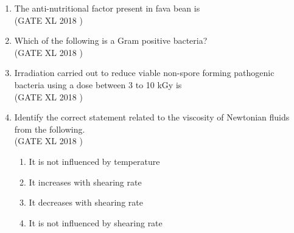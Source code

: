 \documentclass[14pt]{extarticle}
\begin{document}
\begin{flushleft}
\begin{enumerate}
\item The anti-nutritional factor present in fava bean is\\
\hfill(GATE XL 2018 )\\
\begin{enumerate}
\end{enumerate}

\item Which of the following is a Gram positive bacteria?\\
\hfill(GATE XL 2018 )\\
\begin{enumerate}
\end{enumerate}

\item Irradiation carried out to reduce viable non-spore forming pathogenic bacteria using a dose between 3 to 10 kGy is\\
\hfill(GATE XL 2018 )\\
\begin{enumerate}
\end{enumerate}

\item Identify the correct statement related to the viscosity of Newtonian fluids from the following.\\
\hfill(GATE XL 2018 )\\

\begin{enumerate}
    \item It is not influenced by temperature
    \item It increases with shearing rate
    \item It decreases with shearing rate
    \item It is not influenced by shearing rate
\end{enumerate}


\end{enumerate}
\end{flushleft}
\end{document}
